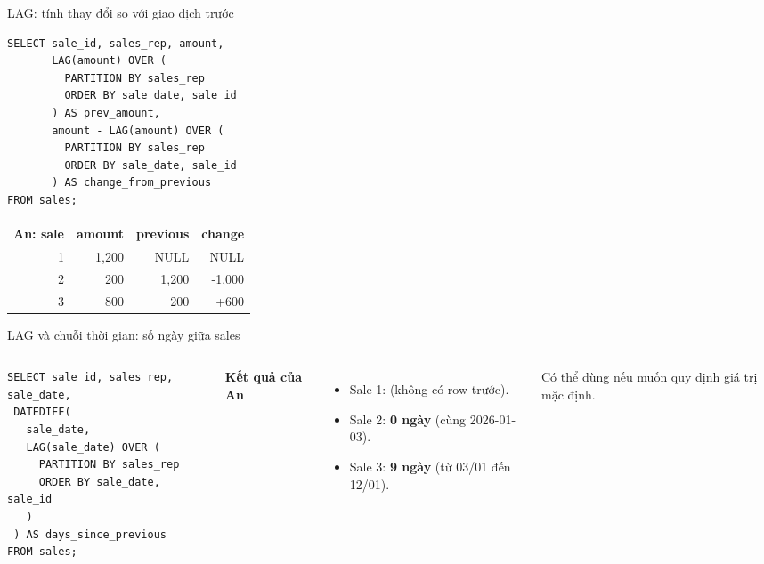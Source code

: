 \documentclass[aspectratio=169,11pt]{beamer}
\newcommand{\code}[1]{{\small\ttfamily\detokenize{#1}}}
\begin{document}
\begin{frame}[fragile]{LAG: tính thay đổi so với giao dịch trước}

\begin{lstlisting}[basicstyle=\ttfamily\fontsize{8.5}{9.7}\selectfont]
SELECT sale_id, sales_rep, amount,
       LAG(amount) OVER (
         PARTITION BY sales_rep
         ORDER BY sale_date, sale_id
       ) AS prev_amount,
       amount - LAG(amount) OVER (
         PARTITION BY sales_rep
         ORDER BY sale_date, sale_id
       ) AS change_from_previous
FROM sales;
\end{lstlisting}
\vspace{0.4em}
\begin{center}
\renewcommand{\arraystretch}{1.18}
\begin{tabular}{rrrr}
\toprule
An: sale & amount & previous & change \\
\midrule
1 & 1,200 & NULL & NULL \\
2 & 200 & 1,200 & -1,000 \\
3 & 800 & 200 & +600 \\
\bottomrule
\end{tabular}
\end{center}
\end{frame}

\begin{frame}[fragile]{LAG và chuỗi thời gian: số ngày giữa sales}
\begin{columns}[T,onlytextwidth]
\begin{lstlisting}[basicstyle=\ttfamily\fontsize{7.9}{9.1}\selectfont]
SELECT sale_id, sales_rep, sale_date,
 DATEDIFF(
   sale_date,
   LAG(sale_date) OVER (
     PARTITION BY sales_rep
     ORDER BY sale_date, sale_id
   )
 ) AS days_since_previous
FROM sales;
\end{lstlisting}

\textbf{Kết quả của An}
\begin{itemize}
\item Sale 1: \code{NULL} (không có row trước).
\item Sale 2: \textbf{0 ngày} (cùng 2026-01-03).
\item Sale 3: \textbf{9 ngày} (từ 03/01 đến 12/01).
\end{itemize}
\vspace{.5em}
\small Có thể dùng \code{LAG(sale_date, 1, ...)} nếu muốn quy định giá trị mặc định.

\end{columns}
\end{frame}
\end{document}
